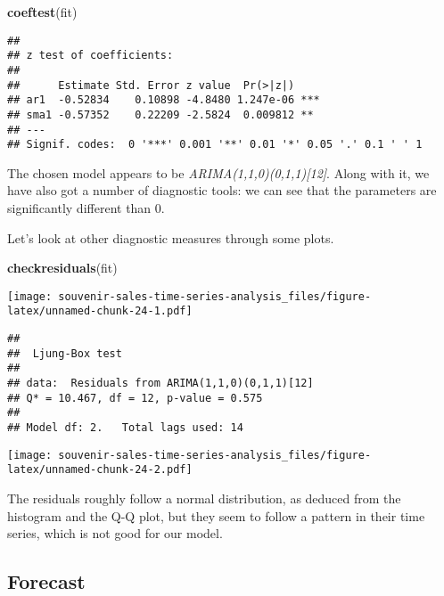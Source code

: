 \documentclass[
]{article}
\newenvironment{Shaded}{\begin{snugshade}}{\end{snugshade}}
\newcommand{\FunctionTok}[1]{\textcolor[rgb]{0.13,0.29,0.53}{\textbf{#1}}}
\newcommand{\NormalTok}[1]{#1}
\newcommand{\SpecialCharTok}[1]{\textcolor[rgb]{0.81,0.36,0.00}{\textbf{#1}}}
\begin{document}
\begin{Shaded}
\begin{Highlighting}[]
\FunctionTok{coeftest}\NormalTok{(fit)}
\end{Highlighting}
\end{Shaded}

\begin{verbatim}
## 
## z test of coefficients:
## 
##      Estimate Std. Error z value  Pr(>|z|)    
## ar1  -0.52834    0.10898 -4.8480 1.247e-06 ***
## sma1 -0.57352    0.22209 -2.5824  0.009812 ** 
## ---
## Signif. codes:  0 '***' 0.001 '**' 0.01 '*' 0.05 '.' 0.1 ' ' 1
\end{verbatim}

The chosen model appears to be \emph{ARIMA(1,1,0)(0,1,1){[}12{]}}. Along
with it, we have also got a number of diagnostic tools: we can see that
the parameters are significantly different than 0.

Let's look at other diagnostic measures through some plots.

\begin{Shaded}
\begin{Highlighting}[]
\FunctionTok{checkresiduals}\NormalTok{(fit)}
\end{Highlighting}
\end{Shaded}

\texttt{[image: souvenir-sales-time-series-analysis\_files/figure-latex/unnamed-chunk-24-1.pdf]}

\begin{verbatim}
## 
##  Ljung-Box test
## 
## data:  Residuals from ARIMA(1,1,0)(0,1,1)[12]
## Q* = 10.467, df = 12, p-value = 0.575
## 
## Model df: 2.   Total lags used: 14
\end{verbatim}

\begin{Shaded}
\end{Shaded}

\texttt{[image: souvenir-sales-time-series-analysis\_files/figure-latex/unnamed-chunk-24-2.pdf]}

The residuals roughly follow a normal distribution, as deduced from the
histogram and the Q-Q plot, but they seem to follow a pattern in their
time series, which is not good for our model.

\hypertarget{forecast}{%
\subsection{Forecast}\label{forecast}}
\end{document}
